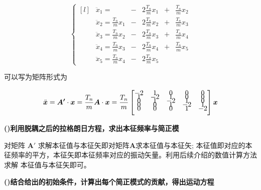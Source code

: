 \documentclass[11pt, a4paper, oneside]{ctexart}
\begin{document}
{\begin{equation}
    \left\{
    \begin{aligned}[l]
    &\ddot{x}_{1}=&-&2 \frac{T_n}{m} x_{1}&+&\frac{T_n}{m} x_{2} \\
    &\ddot{x}_{2}=\frac{T_n}{m} x_1&-&2 \frac{T_n}{m} x_{2}&+&\frac{T_n}{m} x_3 \\
    &\ddot{x}_{3}=\frac{T_n}{m} x_2&-&2 \frac{T_n}{m} x_{3}&+&\frac{T_n}{m} x_{4} \\
    &\ddot{x}_{4}=\frac{T_n}{m} x_{3}&-&2 \frac{T_n}{m} x_{4}&+&\frac{T_n}{m} x_{5} \\
    &\ddot{x}_{5}=\frac{T_n}{m} x_{4}&-&2 \frac{T_n}{m} x_{5}
    \end{aligned}\right.
\end{equation}

可以写为矩阵形式为


\begin{equation}
    \ddot{\boldsymbol{x}}=\boldsymbol{A'} \cdot \boldsymbol{x}=\frac{T_n}{m}\boldsymbol{A} \cdot \boldsymbol{x}=\frac{T_n}{m}\left
    [\begin{matrix}\vspace{-1.5ex}
    -2 & 1 & 0 & 0 & 0 \\\vspace{-1.5ex} 
    1 & -2 & 1 & 0 & 0 \\\vspace{-1.5ex} 
    0 & 1 & -2 & 1 & 0 \\\vspace{-1.5ex} 
    0 & 0 & 1 & -2 & 1 \\\vspace{-1.5ex} 
    0 & 0 & 0 & 1 & -2\vspace{2.5ex} 
    \end{matrix}\right] \boldsymbol{x}
    \end{equation}

\vspace{5mm}
    \textbf{()利用脱耦之后的拉格朗日方程，求出本征频率与简正模}
    \vspace{5mm}

    对矩阵 $\boldsymbol A'$ 求解本征值与本征矢即对矩阵$\boldsymbol A$求本征值与本征矢;
    本征值即对应的本征频率的平方，本征矢即本征频率对应的振动矢量。利用后续介绍的数值计算方法求解
    本征值与本征矢即可。




\vspace{5mm}
\textbf{()结合给出的初始条件，计算出每个简正模式的贡献，得出运动方程}
\vspace{5mm}

}
\end{document}
